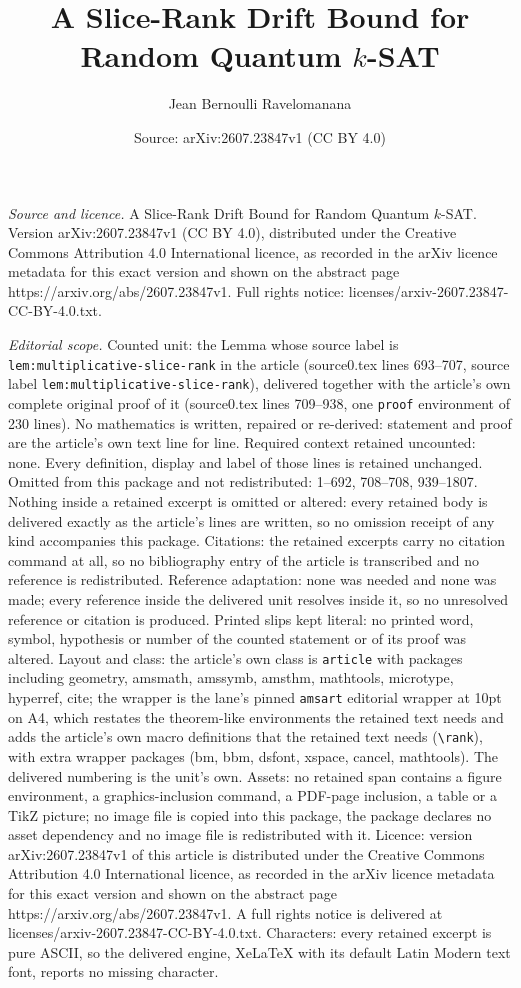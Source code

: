 \documentclass[10pt,a4paper]{amsart}
\title[A Slice-Rank Drift Bound for Random Quantum \(k\)-SAT]{A Slice-Rank Drift Bound for Random Quantum \(k\)-SAT}
\author{Jean Bernoulli Ravelomanana}
\date{Source: arXiv:2607.23847v1 (CC BY 4.0)}
\begin{document}
\maketitle

\noindent\emph{Source and licence.} A Slice-Rank Drift Bound for Random Quantum \(k\)-SAT. Version arXiv:2607.23847v1 (CC BY 4.0), distributed under the Creative Commons Attribution 4.0 International licence, as recorded in the arXiv licence metadata for this exact version and shown on the abstract page https://arxiv.org/abs/2607.23847v1. Full rights notice: licenses/arxiv-2607.23847-CC-BY-4.0.txt.\par\smallskip

\noindent\textit{Editorial scope.} Counted unit: the Lemma whose source label is \texttt{lem:multiplicative-slice-rank} in the article (source0.tex lines 693--707, source label \texttt{lem:multiplicative-slice-rank}), delivered together with the article's own complete original proof of it (source0.tex lines 709--938, one \texttt{proof} environment of 230 lines). No mathematics is written, repaired or re-derived: statement and proof are the article's own text line for line. Required context retained uncounted: none. Every definition, display and label of those lines is retained unchanged. Omitted from this package and not redistributed: 1--692, 708--708, 939--1807. Nothing inside a retained excerpt is omitted or altered: every retained body is delivered exactly as the article's lines are written, so no omission receipt of any kind accompanies this package. Citations: the retained excerpts carry no citation command at all, so no bibliography entry of the article is transcribed and no reference is redistributed. Reference adaptation: none was needed and none was made; every reference inside the delivered unit resolves inside it, so no unresolved reference or citation is produced. Printed slips kept literal: no printed word, symbol, hypothesis or number of the counted statement or of its proof was altered. Layout and class: the article's own class is \texttt{article} with packages including geometry, amsmath, amssymb, amsthm, mathtools, microtype, hyperref, cite; the wrapper is the lane's pinned \texttt{amsart} editorial wrapper at 10pt on A4, which restates the theorem-like environments the retained text needs and adds the article's own macro definitions that the retained text needs (\texttt{\textbackslash rank}), with extra wrapper packages (bm, bbm, dsfont, xspace, cancel, mathtools). The delivered numbering is the unit's own. Assets: no retained span contains a figure environment, a graphics-inclusion command, a PDF-page inclusion, a table or a TikZ picture; no image file is copied into this package, the package declares no asset dependency and no image file is redistributed with it. Licence: version arXiv:2607.23847v1 of this article is distributed under the Creative Commons Attribution 4.0 International licence, as recorded in the arXiv licence metadata for this exact version and shown on the abstract page https://arxiv.org/abs/2607.23847v1. A full rights notice is delivered at licenses/arxiv-2607.23847-CC-BY-4.0.txt. Characters: every retained excerpt is pure ASCII, so the delivered engine, XeLaTeX with its default Latin Modern text font, reports no missing character.
\end{document}
